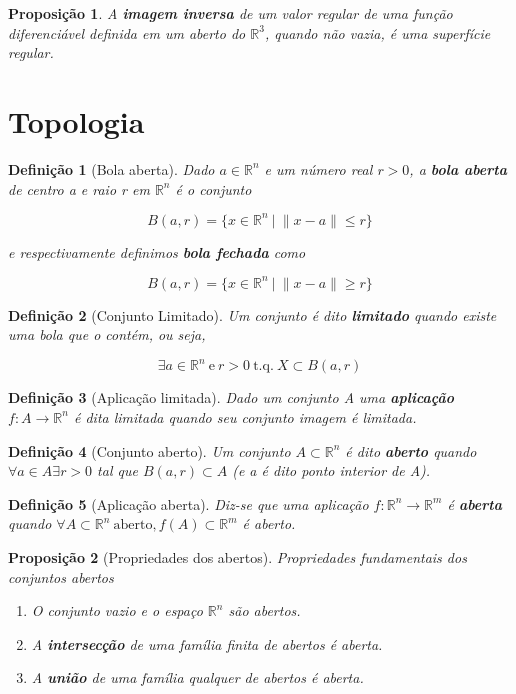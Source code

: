 \documentclass[12pt]{article}
\newtheorem{prop}{Proposição}
\newtheorem{definition}{Definição}
\begin{document}
\begin{prop}
A \textbf{imagem inversa} de um valor regular de uma função diferenciável definida em um aberto do $\mathbb{R}^3$, quando não vazia, é uma superfície regular.
\end{prop}

\section*{Topologia}\label{s3}
\begin{definition}[Bola aberta]
Dado $a \in \mathbb{R}^n$ e um número real $r > 0$, a \textbf{bola aberta} de centro a e raio r em $\mathbb{R}^n$ é o conjunto

$$B(a, r) = \{ x \in \mathbb{R}^n\ |\ \| x - a \| \leq r \}$$

e respectivamente definimos \textbf{bola fechada} como

$$B(a, r) = \{ x \in \mathbb{R}^n\ |\ \| x - a \| \geq r \}$$
\end{definition}

\begin{definition}[Conjunto Limitado]
Um conjunto é dito \textbf{limitado} quando existe uma bola que o contém, ou seja,

$$\exists a \in \mathbb{R}^n\ \mathrm{e}\ r>0\ \mathrm{t.q.}\ X \subset B(a, r)$$
\end{definition}

\begin{definition}[Aplicação limitada]
Dado um conjunto A uma \textbf{aplicação} $f: A \rightarrow \mathbb{R}^n$ é dita limitada quando seu conjunto imagem é limitada.
\end{definition}

\begin{definition}[Conjunto aberto]
Um conjunto $A \subset \mathbb{R}^n$ é dito \textbf{aberto} quando $\forall a \in A \exists r > 0$ tal que $B(a, r) \subset A$ (e a é dito ponto interior de A).
\end{definition}

\begin{definition}[Aplicação aberta]
Diz-se que uma aplicação $f: \mathbb{R}^n \rightarrow \mathbb{R}^m$ é \textbf{aberta} quando $\forall A \subset \mathbb{R}^n\ \mathrm{aberto}, f(A) \subset \mathbb{R}^m$ é aberto.
\end{definition}

\begin{prop}[Propriedades dos abertos]
Propriedades fundamentais dos conjuntos abertos

\begin{enumerate}
    \item O conjunto vazio e o espaço $\mathbb{R}^n$ são abertos.
    
    \item A \textbf{intersecção} de uma família finita de abertos é aberta.
    
    \item A \textbf{união} de uma família qualquer de abertos é aberta.
\end{enumerate}
\end{prop}
\end{document}
